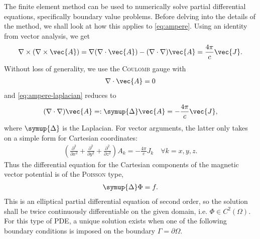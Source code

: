 The finite element method can be used to numerically solve partial differential equations, specifically boundary value problems. Before delving into the details of the method, we shall look at how this applies to \cref{eq:ampere}. Using an identity from vector analysis, we get
\begin{gather}
  \curl (\curl \vec{A}) = \grad (\divg \vec{A}) - (\nabla \cdot \nabla) \vec{A} = \frac{4 \pi}{c} \vec{J}. \label{eq:ampere-laplacian}
\end{gather}
Without loss of generality, we use the \textsc{Coulomb} gauge with
\begin{gather}
  \divg \vec{A} = 0
\end{gather}
and \cref{eq:ampere-laplacian} reduces to
\begin{gather}
  (\nabla \cdot \nabla) \vec{A} =: \symup{\Delta} \vec{A} = -\frac{4 \pi}{c} \vec{J},
\end{gather}
where $\symup{\Delta}$ is the Laplacian. For vector arguments, the latter only takes on a simple form for Cartesian coordinates:
\begin{gather}
  \left ( \frac{\partial^{2}}{\partial x^{2}} + \frac{\partial^{2}}{\partial y^{2}} + \frac{\partial^{2}}{\partial z^{2}} \right ) A_{k} = -\frac{4 \pi}{c} J_{k} \quad \forall k = x, y, z.
\end{gather}
Thus the differential equation for the Cartesian components of the magnetic vector potential is of the \textsc{Poisson} type,
\begin{gather}
  \symup{\Delta} \Phi = f.
\end{gather}
This is an elliptical partial differential equation of second order, so the solution shall be twice continuously differentiable on the given domain, i.e. $\Phi \in C^{2} (\Omega)$. For this type of PDE, a unique solution exists when one of the following boundary conditions is imposed on the boundary $\Gamma = \partial \Omega$.
